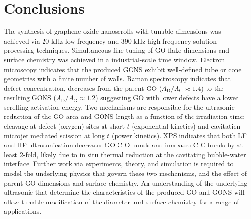 \section{Conclusions}
The synthesis of graphene oxide nanoscrolls with tunable dimensions was achieved via 20 kHz low frequency and 390 kHz high frequency solution processing techniques. Simultaneous fine-tuning of GO flake dimensions and surface chemistry was achieved in a industrial-scale time window. Electron microscopy indicates that the produced GONS exhibit well-defined tube or cone geometries with a finite number of walls. Raman spectroscopy indicates that defect concentration, decreases from the parent GO ($A_{\mathrm{D}}/A_{\mathrm{G}} \approx1.4$) to the resulting GONS ($A_{\mathrm{D}}/A_{\mathrm{G}} \approx1.2$) suggesting GO with lower defects have a lower scrolling activation energy. Two mechanisms are responsible for the ultrasonic reduction of the GO area and GONS length as a function of the irradiation time: cleavage at defect (oxygen) sites at short $t$ (exponential kinetics) and cavitation microjet mediated scission at long $t$ (power kinetics). XPS indicates that both LF and HF ultrasonication decreases GO C-O bonds and increases C-C bonds by at least 2-fold, likely due to in situ thermal reduction at the cavitating bubble-water interface. Further work via experiments, theory, and simulation is required to model the underlying physics that govern these two mechanisms, and the effect of parent GO dimensions and surface chemistry. An understanding of the underlying ultrasonic that determine the characteristics of the produced GO and GONS will allow tunable modification of the diameter and surface chemistry for a range of applications.
